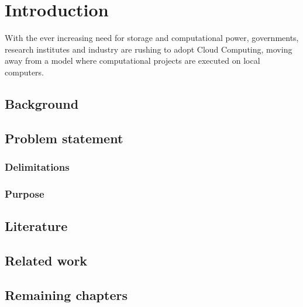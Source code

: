 \chapter{Introduction}
With the ever increasing need for storage and computational power,
governments, research institutes and industry are rushing to adopt
Cloud Computing, moving away from a model where computational projects
are executed on local computers.

\section{Background}




\section{Problem statement}

\subsection{Delimitations}
\subsection{Purpose}

\section{Literature}


\section{Related work}

\section{Remaining chapters}

